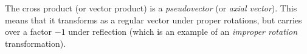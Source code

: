 The cross product (or vector product) is a \emph{pseudovector} (or \emph{axial vector}). This means that it transforms as a regular vector under proper rotations, but carries over a factor $-1$ under reflection (which is an example of an \emph{improper rotation} transformation).